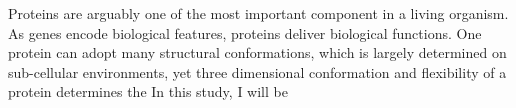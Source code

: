 Proteins are arguably one of the most important component in a living organism. As genes encode biological features, proteins deliver biological functions. One protein can adopt many structural conformations, which is largely determined on sub-cellular environments, yet three dimensional conformation and flexibility of a protein determines the     In this study, I will be 